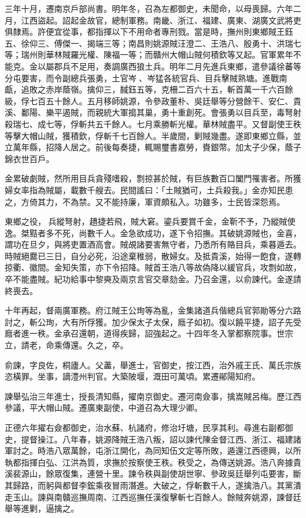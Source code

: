 \begin{pinyinscope}
三年十月，遷南京戶部尚書。明年冬，召為左都御史，未聞命，以母喪歸。六年二月，江西盜起。詔起金故官，總制軍務。南畿、浙江、福建、廣東、湖廣文武將吏俱隸焉。許便宜從事，都指揮以下不用命者專刑戮。當是時，撫州則東鄉賊王鈺五、徐仰三、傅傑一、揭端三等；南昌則姚源賊汪澄二、王浩八、殷勇十、洪瑞七等；瑞州則華林賊羅光權、陳福一等；而贛州大帽山賊何積欽等又起。官軍累年不能克。金以屬郡兵不足用，奏調廣西狼土兵。明年二月先進兵東鄉，遣參議徐蕃等分屯要害，而令副總兵張勇，土官岑、岑猛各統官兵、目兵擊賊熟塘。進戰南甗，追敗之赤岸蔭嶺。擒仰三，馘鈺五等，克柵二百六十五，斬首萬一千六百餘級，俘七百五十餘人。五月移師姚源，令參政董朴、吳廷舉等分營餘干、安仁、貴溪、鄱陽、樂平遏賊，而親統大軍搗其巢，勇十重創死。會張勇以目兵至，毒弩射殺瑞七、成七等，俘斬共五千餘人。七月乘勝斬光權。華林賊盡平。又督副使王秩等擊大帽山賊，獲積欽，俘斬千七百餘人。半歲間，剿賊幾盡。遂即東鄉立縣，並立萬年縣，招降人居之。前後每奏捷，輒賜璽書嘉勞，賚銀幣。加太子少保，蔭子錦衣世百戶。

金累破劇賊，然所用目兵貪殘嗜殺，剽掠甚於賊，有巨族數百口闔門罹害者。所獲婦女率指為賊屬，載數千艘去。民間謠曰：「土賊猶可，土兵殺我。」金亦知民患之，方倚其力，不為禁。又不能持廉，軍資頗私入。功雖多，士民皆深怨焉。

東鄉之役，兵縱弩射，趫捷若飛，賊大窘。鎏兵要賞千金，金靳不予，乃縱賊使逸。桀黠者多不死，尚數千人。金急欲成功，遂下令招撫。其破姚源賊也，金喜，謂功在旦夕，與將吏置酒高會。賊覘諸要害無守者，乃悉所有賂目兵，乘暮遁去。時賊絕爨已三日，自分必死，沿途棄稚弱，散婦女。及抵貴溪，始得一飽食，遂轉掠衢、徽間。金知失策，亦下令招降。賊首王浩八等故偽降以緩官兵，攻剽如故，卒不能盡賊。紀功給事中黎奭及兩京言官交章劾金。乃召金還，以俞諫代。金遂請終喪去。

十年再起，督兩廣軍務。府江賊王公珣等為亂，金集諸道兵偕總兵官郭勛等分六路討之，斬公珣，大有所俘獲。加少保太子太保，廕子如初。復以饒平捷，詔子先受廕者進一秩。金承召還朝，道得疾歸，詔強起之。十四年冬入掌都察院事。世宗立，請老，命乘傳還。久之，卒。

俞諫，字良佐，桐廬人。父藎，舉進士，官御史，按江西，治外戚王氏、萬氏宗族恣橫罪。坐事，謫澧州判官。大築陂堰，溉田可萬頃。累遷鄖陽知府。

諫舉弘治三年進士，授長清知縣，擢南京御史。遷河南僉事，擒嵩賊呂梅。歷江西參議，平大帽山賊。遷廣東副使，中道召為大理少卿。

正德六年擢右僉都御史，治水蘇、杭諸府，修治圩塘，民享其利。尋進右副都御史，提督操江。八年春，姚源降賊王浩八叛，詔以諫代陳金督江西、浙江、福建諸軍討之。時浩八眾萬餘，屯浙江開化，為同知伍文定等所敗，遁還江西德興，以所執都指揮白弘、江洪為質，求撫於按察使王秩。秩受之，為傳送姚源。浩八奔據貴溪裴源山，餘眾復集，連營十里。諫令秩與副使胡世寧、參政吳廷舉列屯要害，斷其歸路，而躬與都督李鋐乘夜冒雨潛進。大破之，俘斬數千人，遂擒浩八。其黨潰走玉山。諫與南贛巡撫周南、江西巡撫任漢復擊斬七百餘人。餘賊奔姚源，諫督廷舉等進剿，逼擒之。


\end{pinyinscope}
